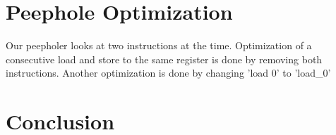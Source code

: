 \documentclass[a4paper]{article}
\begin{document}


\section{Peephole Optimization}
Our peepholer looks at two instructions at the time. Optimization of a consecutive
load and store to the same register is done by removing both instructions.
Another optimization is done by changing 'load 0' to 'load\_0'



\section{Conclusion}



\end{document}

